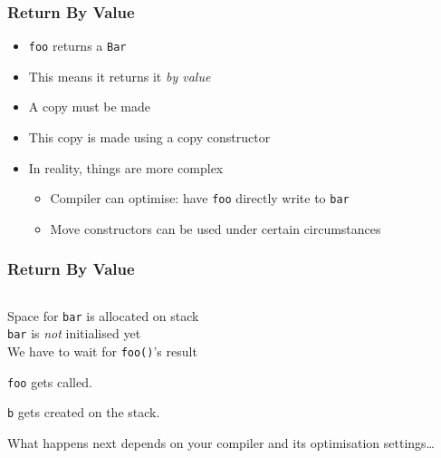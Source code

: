 \begin{frame}
  \frametitle{Return By Value}
  \begin{itemize}
    \item {\tt foo} returns a {\tt Bar}
    \item This means it returns it \emph{by value}
    \item A copy must be made
    \item This copy is made using a copy constructor
    \item In reality, things are more complex
          \begin{itemize}
            \item Compiler can optimise: have {\tt foo} directly write to {\tt bar}
            \item Move constructors can be used under certain circumstances
          \end{itemize}
  \end{itemize}
\end{frame}

\begin{frame}
  \frametitle{Return By Value}
  \begin{center}
    \begin{columns}
      \column{4cm}
      \column{4cm}
    \end{columns}
  \end{center}
  \vskip2mm
  \begin{overprint}
    \begin{center}
      Space for {\tt bar} is allocated on stack \\
      {\tt bar} is \emph{not} initialised yet \\
      We have to wait for {\tt foo()}'s result
    \end{center}

    \begin{center}
      {\tt foo} gets called.
    \end{center}

    \begin{center}
      {\tt b} gets created on the stack.
    \end{center}

    \begin{center}
      What happens next depends on your compiler and its optimisation settings\dots
    \end{center}
  \end{overprint}
\end{frame}

